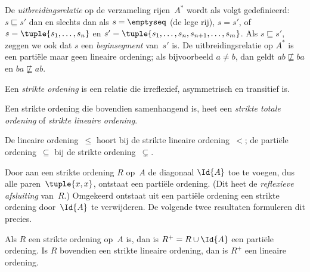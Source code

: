 \documentclass[openany]{memoir}
\begin{document}
\begin{ex}
De \emph{uitbreidingsrelatie} op de verzameling rijen~$A^*$ wordt als volgt
gedefinieerd: $s \sqsubseteq s'$ dan en slechts dan als $s = \emptyseq$ (de lege
rij), $s = s'$, of $s = \tuple{s_1, \dots, s_n}$ en $s' =
\tuple{s_1, \dots, s_n, s_{n+1}, \dots, s_m}$. Als $s \sqsubseteq s'$,
zeggen we ook dat $s$ een \emph{beginsegment} van~$s'$ is. De
uitbreidingsrelatie op $A^*$ is een partiële maar geen lineaire ordening; als
bijvoorbeeld $a \neq b$, dan geldt $ab \not\sqsubseteq ba$ en $ba \not\sqsubseteq ab$.
\end{ex}

\begin{defn}
Een \emph{strikte ordening} is een relatie die irreflexief, asymmetrisch en
transitief is.
\end{defn}

\begin{defn}
Een strikte ordening die bovendien samenhangend is, heet een
\emph{strikte totale ordening} of \emph{strikte lineaire ordening}.
\end{defn}

\begin{ex}
De lineaire ordening~$\le$ hoort bij de strikte lineaire ordening~$<$; de
partiële ordening~$\subseteq$ bij de strikte ordening~$\subsetneq$.
\end{ex}

Door aan een strikte ordening $R$ op~$A$ de diagonaal $\Id{A}$ toe te voegen,
dus alle paren~$\tuple{x, x}$, ontstaat een partiële ordening.  (Dit heet de
\emph{reflexieve afsluiting} van~$R$.) Omgekeerd ontstaat uit een partiële
ordening een strikte ordening door~$\Id{A}$ te verwijderen. De volgende twee
resultaten formuleren dit precies.

\begin{prop}
Als $R$ een strikte ordening op~$A$ is, dan is $R^+ = R \cup \Id{A}$ een
partiële ordening. Is $R$ bovendien een strikte lineaire ordening, dan is
$R^+$ een lineaire ordening.
\end{prop}
\end{document}

